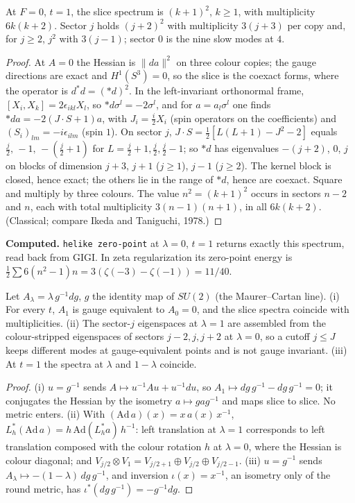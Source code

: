 \begin{proposition}\label{p4prop:empty}
 At $F=0$, $t=1$, the slice spectrum is $(k+1)^2$, $k\geq1$, with multiplicity $6k(k+2)$. Sector $j$
holds $(j+2)^2$ with multiplicity $3(j+3)$ per copy and, for $j\geq2$, $j^2$ with $3(j-1)$; sector $0$ is the nine slow modes at $4$.
\end{proposition}
\begin{proof}
At $A=0$ the Hessian is $\|da\|^2$ on three colour copies; the gauge directions are exact and $H^1(S^3)=0$, so the slice is
the coexact forms, where the operator is $d^*d=(*d)^2$. In the left-invariant orthonormal frame, $[X_i,X_k]=2\epsilon_{ikl}X_l$,
so $*d\sigma^l=-2\sigma^l$, and for $a=a_l\sigma^l$ one finds $*da=-2(J\cdot S+1)a$, with $J_i=\tfrac i2X_i$ (spin operators
on the coefficients) and $(S_i)_{lm}=-i\epsilon_{ilm}$ (spin $1$). On sector $j$, $J\cdot S=\tfrac12[L(L+1)-J^2-2]$ equals
$\tfrac j2,\,-1,\,-(\tfrac j2+1)$ for $L=\tfrac j2+1,\tfrac j2,\tfrac j2-1$; so $*d$ has eigenvalues $-(j+2)$, $0$, $j$ on blocks of
dimension $j+3$, $j+1$ ($j\geq1$), $j-1$ ($j\geq2$). The kernel block is closed, hence exact; the others lie in the range of
$*d$, hence are coexact. Square and multiply by three colours. The value $n^2=(k+1)^2$ occurs in sectors $n-2$ and $n$, each
with total multiplicity $3(n-1)(n+1)$, in all $6k(k+2)$. (Classical; compare Ikeda and Taniguchi, 1978.)
\end{proof}
\noindent\textbf{Computed.} \texttt{helike zero-point} at $\lambda=0$, $t=1$ returns exactly this spectrum, read back from
GIGI. In zeta regularization its zero-point energy is $\tfrac12\sum6(n^2-1)n=3(\zeta(-3)-\zeta(-1))=11/40$.

\begin{proposition}\label{p4prop:flat}
 Let $A_\lambda=\lambda\,g^{-1}dg$, $g$ the identity map of $SU(2)$ (the Maurer--Cartan line).
(i) For every $t$, $A_1$ is gauge equivalent to $A_0=0$, and the slice spectra coincide with multiplicities.
(ii) The sector-$j$ eigenspaces at $\lambda=1$ are assembled from the colour-stripped eigenspaces of sectors $j-2,j,j+2$ at
$\lambda=0$, so a cutoff $j\leq J$ keeps different modes at gauge-equivalent points and is not gauge invariant.
(iii) At $t=1$ the spectra at $\lambda$ and $1-\lambda$ coincide.
\end{proposition}
\begin{proof}
(i) $u=g^{-1}$ sends $A\mapsto u^{-1}Au+u^{-1}du$, so $A_1\mapsto dg\,g^{-1}-dg\,g^{-1}=0$; it conjugates the Hessian by the
isometry $a\mapsto gag^{-1}$ and maps slice to slice. No metric enters. (ii) With $(\mathrm{Ad}\,a)(x)=x\,a(x)\,x^{-1}$,
$L_h^*(\mathrm{Ad}\,a)=h\,\mathrm{Ad}(L_h^*a)\,h^{-1}$: left translation at $\lambda=1$ corresponds to left translation
composed with the colour rotation $h$ at $\lambda=0$, where the Hessian is colour diagonal; and
$V_{j/2}\otimes V_1=V_{j/2+1}\oplus V_{j/2}\oplus V_{j/2-1}$. (iii) $u=g^{-1}$ sends $A_\lambda\mapsto-(1-\lambda)\,dg\,g^{-1}$,
and inversion $\iota(x)=x^{-1}$, an isometry only of the round metric, has $\iota^*(dg\,g^{-1})=-g^{-1}dg$.
\end{proof}

